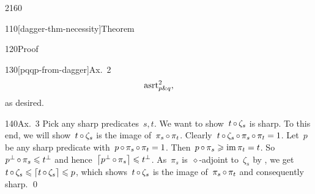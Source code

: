 \begin{parsec}{2160}
\begin{point}{110}[dagger-thm-necessity]{Theorem}
\begin{point}{120}{Proof}
\begin{point}{130}[pqqp-from-dagger]{Ax.~2}
\begin{align*}
    \mathrm{asrt}_{p \mathbin{\&} q}^2,
\end{align*}
as desired.
\end{point}
\begin{point}{140}{Ax.~3}%
Pick any sharp predicates~$s,t$.
We want to show~$t \mathop{\circ} \zeta_s$ is sharp.
To this end, we will show~$t \mathop{\circ} \zeta_s$
    is the image of~$\pi_s \mathop{\circ} \pi_t$.
Clearly~$t \mathop{\circ} \zeta_s \mathop{\circ} \pi_s \mathop{\circ} \pi_t = 1$.
Let~$p$ be any sharp predicate with~$p \mathop{\circ} \pi_s \mathop{\circ} \pi_t = 1$.
Then~$p \mathop{\circ} \pi_s \geqslant \operatorname{im} \pi_t = t$.
So~$  p^\perp \mathop{\circ} \pi_s \leqslant t^\perp$
and hence~$\left\lceil p^\perp \mathop{\circ} \pi_s\right\rceil \leqslant t^\perp$.
As~$\pi_s$ is~$\diamond$-adjoint to~$\zeta_s$ by ,
we get~$t \mathop{\circ} \zeta_s \leqslant \left\lceil t \mathop{\circ} \zeta_s\right\rceil \leqslant p$,
    which shows~$t \mathop{\circ} \zeta_s$
    is the image of~$\pi_s \mathop{\circ} \pi_t$
    and consequently sharp. \qed
\end{point}
\end{point}
\end{point}

    
\end{parsec}

